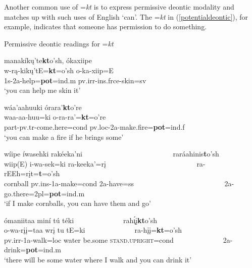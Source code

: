 Another common use of =\textit{kt} is to express permissive deontic modality and matches up with such uses of English `can'. The =\textit{kt} in (\ref{potentialdeontic}), for example, indicates that someone has permission to do something.



\begin{exe}

\item\label{potentialdeontic} Permissive deontic readings for =\textit{kt}

	\begin{xlist}
	
	\item\label{potentialdeontic1}
	\glll manakíkų'te\textbf{kt}o'sh, ókaxiipe\\
	w-rą-kikų'tE=\textbf{kt}=o'sh o-ka-xiip=E\\
	1s-2a-\textnormal{help}=\textbf{pot}=ind.m pv.irr-ins.frce-\textnormal{skin}=sv\\
	\glt `you can help me skin it' \citep[41]{hollow1973a}

	\item\label{potentialdeontic2}
	\glll wáa'aahuuki órara'\textbf{kt}o're\\
	waa-aa-huu=ki o-ra-ra'=\textbf{kt}=o're\\
	part-pv.tr-\textnormal{come.here}=cond pv.loc-2a-\textnormal{make.fire}=\textbf{pot}=ind.f\\
	\glt `you can make a fire if he brings some' \citep[120]{hollow1973a}

	\item\label{potentialdeontic3}
	\glll wíipe íwasehki rakéeka'ni ~ ~ ~ ~ ~ ~ ~ ~ ~ ~ ~ ~ ~ ~ ~  raráahinis\textbf{t}o'sh\\
	wiip(E) i-wa-sek=ki ra-keeka'=rį ~ ~ ~ ~ ~ ~ ~ ~ ~ ~ ~ ~ ~ ~ ~  ra-rEEh=rįt=\textbf{t}=o'sh\\
	\textnormal{cornball} pv.ins-1a-\textnormal{make}=cond 2a-\textnormal{have}=ss ~ ~ ~ ~ ~ ~ ~ ~ ~ ~ ~ ~ ~ ~ ~  2a-\textnormal{go.there}=2pl=\textbf{pot}=ind.m\\
	\glt `if I make cornballs, you can have them and go' \citep[268]{hollow1973b}

	\item\label{potentialdeontic4}
	\glll ómaniitaa miní tú téki ~ ~ ~ ~ ~ ~ ~ ~  rah\'{ı̨}į\textbf{kt}o'sh\\
	o-wa-rįį=taa wrį tu tE=ki ~ ~ ~ ~ ~ ~ ~ ~  ra-hįį=\textbf{kt}=o'sh\\
	pv.irr-1a-\textnormal{walk}=loc \textnormal{water} \textnormal{be.some} \textsc{stand.upright}=cond ~ ~ ~ ~ ~ ~ ~ ~ 2a-\textnormal{drink}=\textbf{pot}=ind.m\\
	\glt `there will be some water where I walk and you can drink it' \citep[114]{hollow1973a}
	
	\end{xlist}

\end{exe}

